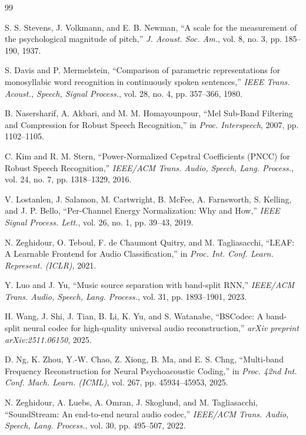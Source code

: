 \documentclass[twocolumn]{article}
\begin{document}
\begin{thebibliography}{99}

S. S. Stevens, J. Volkmann, and E. B. Newman,
``A scale for the measurement of the psychological magnitude of pitch,''
\textit{J. Acoust. Soc. Am.}, vol. 8, no. 3, pp. 185--190, 1937.

S. Davis and P. Mermelstein,
``Comparison of parametric representations for monosyllabic word recognition in continuously spoken sentences,''
\textit{IEEE Trans. Acoust., Speech, Signal Process.}, vol. 28, no. 4, pp. 357--366, 1980.

B. Nasersharif, A. Akbari, and M. M. Homayounpour,
``Mel Sub-Band Filtering and Compression for Robust Speech Recognition,''
in \textit{Proc. Interspeech}, 2007, pp. 1102--1105.

C. Kim and R. M. Stern,
``Power-Normalized Cepstral Coefficients (PNCC) for Robust Speech Recognition,''
\textit{IEEE/ACM Trans. Audio, Speech, Lang. Process.}, vol. 24, no. 7, pp. 1318--1329, 2016.

V. Lostanlen, J. Salamon, M. Cartwright, B. McFee, A. Farnsworth, S. Kelling, and J. P. Bello,
``Per-Channel Energy Normalization: Why and How,''
\textit{IEEE Signal Process. Lett.}, vol. 26, no. 1, pp. 39--43, 2019.

N. Zeghidour, O. Teboul, F. de Chaumont Quitry, and M. Tagliasacchi,
``LEAF: A Learnable Frontend for Audio Classification,''
in \textit{Proc. Int. Conf. Learn. Represent. (ICLR)}, 2021.

Y. Luo and J. Yu,
``Music source separation with band-split RNN,''
\textit{IEEE/ACM Trans. Audio, Speech, Lang. Process.}, vol. 31, pp. 1893--1901, 2023.

H. Wang, J. Shi, J. Tian, B. Li, K. Yu, and S. Watanabe,
``BSCodec: A band-split neural codec for high-quality universal audio reconstruction,''
\textit{arXiv preprint arXiv:2511.06150}, 2025.

D. Ng, K. Zhou, Y.-W. Chao, Z. Xiong, B. Ma, and E. S. Chng,
``Multi-band Frequency Reconstruction for Neural Psychoacoustic Coding,''
in \textit{Proc. 42nd Int. Conf. Mach. Learn. (ICML)}, vol. 267, pp. 45934--45953, 2025.

N. Zeghidour, A. Luebs, A. Omran, J. Skoglund, and M. Tagliasacchi,
``SoundStream: An end-to-end neural audio codec,''
\textit{IEEE/ACM Trans. Audio, Speech, Lang. Process.}, vol. 30, pp. 495--507, 2022.


\end{thebibliography}
\end{document}
